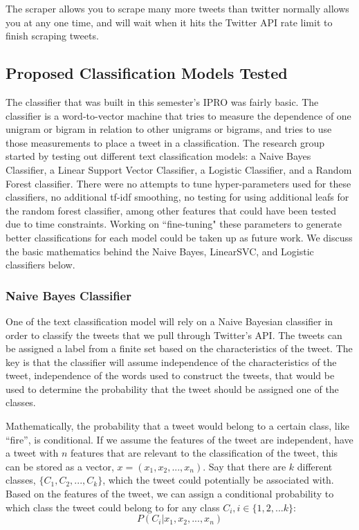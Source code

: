 \documentclass[titlepage, 12pt]{article}
\begin{document}
\hspace{0.5 cm}The scraper allows you to scrape many more tweets than twitter normally allows you at any one time, and will wait when it hits the Twitter API rate limit to finish scraping tweets.

\subsection{Proposed Classification Models Tested}
\hspace{0.5 cm}The classifier that was built in this semester's IPRO was fairly basic. The classifier is a word-to-vector machine that tries to measure the dependence of one unigram or bigram in relation to other unigrams or bigrams, and tries to use those measurements to place a tweet in a classification. The research group started by testing out different text classification models: a Naive Bayes Classifier, a Linear Support Vector Classifier, a Logistic Classifier, and a Random Forest classifier. There were no attempts to tune hyper-parameters used for these classifiers, no additional tf-idf smoothing, no testing for using additional leafs for the random forest classifier, among other features that could have been tested due to time constraints. Working on ``fine-tuning" these parameters to generate better classifications for each model could be taken up as future work. We discuss the basic mathematics behind the Naive Bayes, LinearSVC, and Logistic classifiers below.
\subsubsection{Naive Bayes Classifier}
\hspace{0.5 cm}One of the text classification model will rely on a Naive Bayesian classifier in order to classify the tweets that we pull through Twitter's API. The tweets can be assigned a label from a finite set based on the characteristics of the tweet. The key is that the classifier will assume independence of the characteristics of the tweet, independence of the words used to construct the tweets, that would be used to determine the probability that the tweet should be assigned one of the classes.

Mathematically, the probability that a tweet would belong to a certain class, like ``fire'', is conditional. If we assume the features of the tweet are independent, have a tweet with $n$ features that are relevant to the classification of the tweet, this can be stored as a vector, $x = (x_1, x_2, ..., x_n)$. Say that there are $k$ different classes, $\{C_1, C_2, ..., C_k\}$, which the tweet could potentially be associated with. Based on the features of the tweet, we can assign a conditional probability to which class the tweet could belong to for any class $C_i, i \in \{1, 2, ... k\}$:
\begin{equation}
    P(C_i | x_1, x_2, ..., x_n)
\end{equation}
\end{document}
